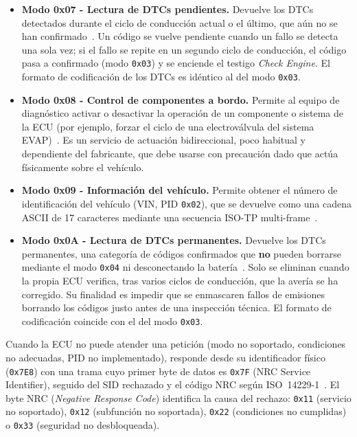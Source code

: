 \begin{itemize}
    \item \textbf{Modo 0x07 - Lectura de DTCs pendientes.} Devuelve los DTCs detectados durante el ciclo de conducción actual o el último, que aún no se han confirmado~\cite{SAEJ1979:2014}. Un código se vuelve pendiente cuando un fallo se detecta una sola vez; si el fallo se repite en un segundo ciclo de conducción, el código pasa a confirmado (modo \texttt{0x03}) y se enciende el testigo \textit{Check Engine}. El formato de codificación de los DTCs es idéntico al del modo \texttt{0x03}.

    \item \textbf{Modo 0x08 - Control de componentes a bordo.} Permite al equipo de diagnóstico activar o desactivar la operación de un componente o sistema de la ECU (por ejemplo, forzar el ciclo de una electroválvula del sistema EVAP)~\cite{SAEJ1979:2014}. Es un servicio de actuación bidireccional, poco habitual y dependiente del fabricante, que debe usarse con precaución dado que actúa físicamente sobre el vehículo.

    \item \textbf{Modo 0x09 - Información del vehículo.} Permite obtener el número de identificación del vehículo (VIN, PID \texttt{0x02}), que se devuelve como una cadena ASCII de 17 caracteres mediante una secuencia ISO-TP multi-frame~\cite{SAEJ1979:2014, ISO15765-2:2016}.

    \item \textbf{Modo 0x0A - Lectura de DTCs permanentes.} Devuelve los DTCs permanentes, una categoría de códigos confirmados que \textbf{no} pueden borrarse mediante el modo \texttt{0x04} ni desconectando la batería~\cite{SAEJ1979:2014}. Solo se eliminan cuando la propia ECU verifica, tras varios ciclos de conducción, que la avería se ha corregido. Su finalidad es impedir que se enmascaren fallos de emisiones borrando los códigos justo antes de una inspección técnica. El formato de codificación coincide con el del modo \texttt{0x03}.
\end{itemize}

Cuando la ECU no puede atender una petición (modo no soportado, condiciones no adecuadas, PID no implementado), responde desde su identificador físico (\texttt{0x7E8}) con una trama cuyo primer byte de datos es \texttt{0x7F} (NRC Service Identifier), seguido del SID rechazado y el código NRC según ISO~14229-1~\cite{ISO14229-1:2020}. El byte NRC (\textit{Negative Response Code}) identifica la causa del rechazo: \texttt{0x11} (servicio no soportado), \texttt{0x12} (subfunción no soportada), \texttt{0x22} (condiciones no cumplidas) o \texttt{0x33} (seguridad no desbloqueada).


